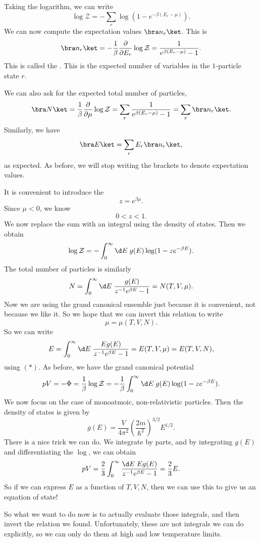\documentclass[a4paper]{article}
\begin{document}
Taking the logarithm, we can write
\[
  \log \mathcal{Z} = - \sum_r \log(1 - e^{-\beta (E_r - \mu)}).
\]
We can now compute the expectation values $\bra n_r\ket$. This is
\[
  \bra n_r \ket = - \frac{1}{\beta} \frac{\partial}{\partial E_r} \log \mathcal{Z} = \frac{1}{e^{\beta(E_r - \mu)} - 1}.
\]
This is called the . This is the expected number of variables in the $1$-particle state $r$.

We can also ask for the expected total number of particles,
\[
  \bra N\ket = \frac{1}{\beta} \frac{\partial}{\partial \mu}\log \mathcal{Z} = \sum_r \frac{1}{e^{\beta(E_r - \mu)} - 1} = \sum_r \bra n_r\ket.
\]
Similarly, we have
\[
  \bra E\ket = \sum_r E_r \bra n_r\ket,
\]
as expected. As before, we will stop writing the brackets to denote expectation values.

It is convenient to introduce the 
\[
  z = e^{\beta\mu}.
\]
Since $\mu < 0$, we know
\[
  0 < z < 1.
\]
We now replace the sum with an integral using the density of states. Then we obtain
\[
  \log \mathcal{Z} = - \int_0^\infty \d E\; g(E) \log (1 - z e^{-\beta E}).
\]
The total number of particles is similarly
\[
  N = \int_0^\infty \d E\; \frac{g(E)}{z^{-1} e^{\beta E} - 1} = N(T, V, \mu).
\]
Now we are using the grand canonical ensemble just because it is convenient, not because we like it. So we hope that we can invert this relation to write %
\[
  \mu = \mu(T, V, N).\tag{$*$}
\]
So we can write
\[
  E = \int_0^\infty \d E\; \frac{E g(E)}{z^{-1} e^{\beta E} - 1} = E(T, V, \mu) = E(T, V, N),
\]
using $(*)$. As before, we have the grand canonical potential
\[
  pV = -\Phi = \frac{1}{\beta} \log \mathcal{Z} = -\frac{1}{\beta} \int_0^\infty \d E\; g(E) \log(1 - ze^{-\beta E}).
\]
We now focus on the case of monoatmoic, non-relativistic particles. Then the density of states is given by
\[
  g(E) = \frac{V}{4\pi^2} \left(\frac{2m}{\hbar^2}\right)^{3/2} E^{1/2}.
\]
There is a nice trick we can do. We integrate by parts, and by integrating $g(E)$ and differentiating the $\log$, we can obtain
\[
  pV = \frac{2}{3} \int_0^\infty \frac{\d E\; Eg(E)}{z^{-1} e^{\beta E} - 1} = \frac{2}{3} E.
\]
So if we can express $E$ as a function of $T, V, N$, then we can use this to give us an equation of state!

So what we want to do now is to actually evaluate those integrals, and then invert the relation we found. Unfortunately, these are not integrals we can do explicitly, so we can only do them at high and low temperature limits.
\end{document}
